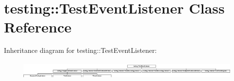 \hypertarget{classtesting_1_1TestEventListener}{}\section{testing\+:\+:Test\+Event\+Listener Class Reference}
\label{classtesting_1_1TestEventListener}
Inheritance diagram for testing\+:\+:Test\+Event\+Listener\+:\begin{figure}[H]
\begin{center}
\leavevmode
\includegraphics[height=0.926641cm]{classtesting_1_1TestEventListener}
\end{center}
\end{figure}
